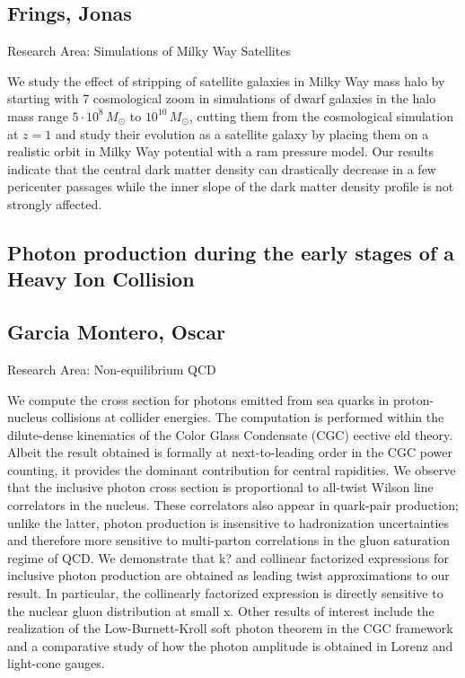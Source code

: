 \subsection*{\centering \normalsize Frings, Jonas}
Research Area: Simulations of Milky Way Satellites \newline

\noindent We study the effect of stripping of satellite galaxies in Milky Way mass halo by starting with 7 cosmological zoom in simulations of dwarf galaxies in the halo mass range $5\cdot10^8\,M_\odot$ to $10^10\,M_\odot$, cutting them from the cosmological simulation at $z=1$ and study their evolution as a satellite galaxy by placing them on a realistic orbit in Milky Way potential with a ram pressure model. Our results indicate that the central dark matter density can drastically decrease in a few pericenter passages while the inner slope of the dark matter density profile is not strongly affected.

\newpage
\subsection*{\centering \large Photon production during the early stages of a Heavy Ion Collision}
\subsection*{\centering \normalsize Garcia Montero, Oscar}
Research Area: Non-equilibrium QCD\newline

\noindent We compute the cross section for photons emitted from sea quarks in proton-nucleus collisions at collider energies. The computation is performed within the dilute-dense kinematics of the Color Glass Condensate (CGC) eective eld theory. Albeit the result obtained is formally at next-to-leading order in the CGC power counting, it provides the dominant contribution for central rapidities. We observe that the inclusive photon cross section is proportional to all-twist Wilson line correlators in the nucleus. These correlators also appear in quark-pair production; unlike the latter, photon production is insensitive to hadronization uncertainties and therefore more sensitive to multi-parton correlations in the gluon saturation regime of QCD. We demonstrate that k? and collinear factorized expressions for inclusive photon production are obtained as leading twist approximations to our result. In particular, the collinearly factorized expression is directly sensitive to the nuclear gluon distribution at small x. Other results of interest include the realization of the Low-Burnett-Kroll soft photon theorem in the CGC framework and a comparative study of how the photon amplitude is obtained in Lorenz and light-cone gauges.

